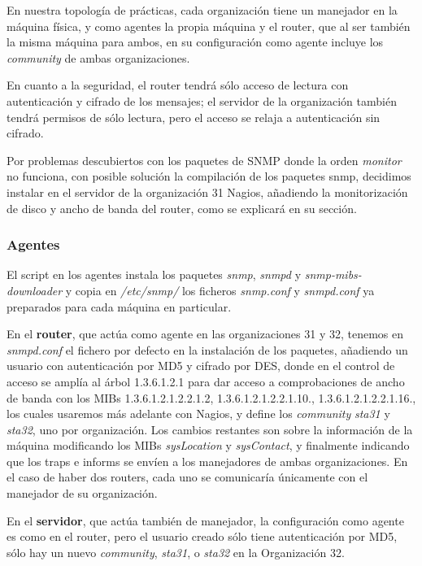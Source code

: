 \documentclass[]{article}
\begin{document}
\hfill

En nuestra topología de prácticas, cada organización tiene un manejador en la máquina física, y como agentes la propia máquina y el router, que al ser también la misma máquina para ambos, en su configuración como agente incluye los \textit{community} de ambas organizaciones.

En cuanto a la seguridad, el router tendrá sólo acceso de lectura con autenticación y cifrado de los mensajes; el servidor de la organización también tendrá permisos de sólo lectura, pero el acceso se relaja a autenticación sin cifrado.

Por problemas descubiertos con los paquetes de SNMP donde la orden \textit{monitor} no funciona, con posible solución la compilación de los paquetes snmp, decidimos instalar en el servidor de la organización 31 Nagios, añadiendo la monitorización de disco y ancho de banda del router, como se explicará en su sección.

\subsubsection{Agentes}

El script en los agentes instala los paquetes \textit{snmp}, \textit{snmpd} y \textit{snmp-mibs-downloader} y copia en \textit{/etc/snmp/} los ficheros \textit{snmp.conf} y \textit{snmpd.conf} ya preparados para cada máquina en particular.

En el \textbf{router}, que actúa como agente en las organizaciones 31 y 32, tenemos en \textit{snmpd.conf} el fichero por defecto en la instalación de los paquetes, añadiendo un usuario con autenticación por MD5 y cifrado por DES, donde en el control de acceso se amplía al árbol 1.3.6.1.2.1 para dar acceso a comprobaciones de ancho de banda con los MIBs 1.3.6.1.2.1.2.2.1.2,  1.3.6.1.2.1.2.2.1.10., 1.3.6.1.2.1.2.2.1.16., los cuales usaremos más adelante con Nagios, y define los \textit{community} \textit{sta31} y \textit{sta32}, uno por organización. Los cambios restantes son sobre la información de la máquina modificando los MIBs \textit{sysLocation} y \textit{sysContact}, y finalmente indicando que los traps e informs se envíen a los manejadores de ambas organizaciones. En el caso de haber dos routers, cada uno se comunicaría únicamente con el manejador de su organización.

En el \textbf{servidor}, que actúa también de manejador, la configuración como agente es como en el router, pero el usuario creado sólo tiene autenticación por MD5, sólo hay un nuevo \textit{community}, \textit{sta31}, o \textit{sta32} en la Organización 32.
\end{document}
